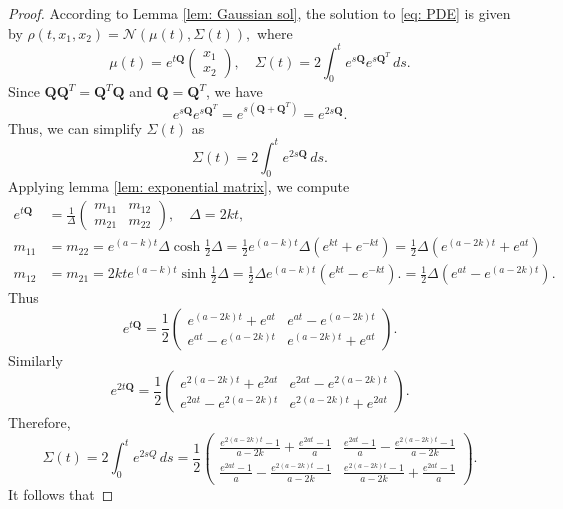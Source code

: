 \documentclass[a4paper,twoside]{article}      %
\theoremstyle{definition}
\begin{document}
\begin{proof}
According to Lemma \ref{lem: Gaussian sol}, the solution to \eqref{eq: PDE} is given by
$
\rho(t,x_1,x_2)=\mathcal{N}(\mu(t), \Sigma(t)),
$
where 
$$
\mu(t)=e^{t\mathbf{Q}}\begin{pmatrix}
    x_1\\x_2
\end{pmatrix},\quad \Sigma(t)=2\int_0^t e^{s\mathbf{Q}} e^{s\mathbf{Q}^T}\,ds.
$$
Since $\mathbf{Q}\mathbf{Q}^T=\mathbf{Q}^T\mathbf{Q}$ and $\mathbf{Q}=\mathbf{Q}^T$, we have
$$
e^{s\mathbf{Q}} e^{s\mathbf{Q}^T}=e^{s(\mathbf{Q}+\mathbf{Q}^T)}=
e^{2s\mathbf{Q}}.
$$
Thus, we can simplify $\Sigma(t)$ as
\begin{equation*}
\Sigma(t)=2\int_0^t e^{2s\mathbf{Q}}\,ds.
\end{equation*}
Applying lemma \ref{lem: exponential matrix}, we compute 
\begin{align*}
 e^{t\mathbf{Q}}&= \frac{1}{\Delta}\begin{pmatrix}
    m_{11}& m_{12}\\ m_{21}& m_{22}
 \end{pmatrix}, \quad \Delta= 2kt,\\
 m_{11}&=m_{22}=e^{(a-k) t}\Delta \cosh{\frac{1}{2}\Delta}=\frac{1}{2}e^{(a-k) t}\Delta(e^{kt}+e^{-kt})=\frac{1}{2}\Delta (e^{(a-2k)t}+e^{at})\\
 m_{12}&=m_{21}=2kt e^{(a-k) t} \sinh{\frac{1}{2}\Delta}=\frac{1}{2}\Delta e^{(a-k)t}(e^{kt} -e^{-kt}).=\frac{1}{2}\Delta (e^{at} -e^{(a-2k)t}).
\end{align*}
Thus
$$
e^{t\mathbf{Q}}=\frac{1}{2}\begin{pmatrix}
e^{(a-2k)t}+e^{at}& e^{at} -e^{(a-2k)t}\\
e^{at} -e^{(a-2k)t}&e^{(a-2k)t}+e^{at}
\end{pmatrix}.
$$
Similarly
$$
e^{2t\mathbf{Q}}=\frac{1}{2}\begin{pmatrix}
e^{2(a-2k)t}+e^{2at}& e^{2at} -e^{2(a-2k)t}\\
e^{2at} -e^{2(a-2k)t}&e^{2(a-2k)t}+e^{2at}
\end{pmatrix}.
$$
Therefore,
$$
\Sigma(t)=2\int_0^t e^{2s Q}\,ds=\frac{1}{2}\begin{pmatrix}
 \frac{e^{2(a-2k)t}-1}{a-2k}+\frac{e^{2at}-1}{a}&\frac{e^{2at}-1}{a}- \frac{e^{2(a-2k)t}-1}{a-2k}  \\
 \frac{e^{2at}-1}{a}- \frac{e^{2(a-2k)t}-1}{a-2k}   &\frac{e^{2(a-2k)t}-1}{a-2k}+\frac{e^{2at}-1}{a}
\end{pmatrix}.
$$
It follows that   

\end{proof}
\end{document}
